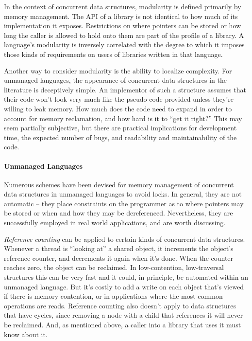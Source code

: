 In the context of concurrent data structures, modularity is defined primarily by memory management.  The API of a library is not identical to how much of its implementation it exposes.  Restrictions on where pointers can be stored or how long the caller is allowed to hold onto them are part of the profile of a library.  A language's modularity is inversely correlated with the degree to which it imposes those kinds of requirements on users of libraries written in that language.

Another way to consider modularity is the ability to localize complexity.  For unmanaged languages, the appearance of concurrent data structures in the literature is deceptively simple.  An implementor of such a structure assumes that their code won't look very much like the pseudo-code provided unless they're willing to leak memory.  How much does the code need to expand in order to account for memory reclamation, and how hard is it to ``get it right?''  This may seem partially subjective, but there are practical implications for development time, the expected number of bugs, and readability and maintainability of the code.

\paragraph{Unmanaged Languages} Numerous schemes have been devised for memory management of concurrent data structures in unmanaged languages to avoid locks.  In general, they are not automatic -- they place constraints on the programmer as to where pointers may be stored or when and how they may be dereferenced.  Nevertheless, they are successfully employed in real world applications, and are worth discussing.

\textit{Reference counting} can be applied to certain kinds of concurrent data structures\cite{DMMS, GPST09}.  Whenever a thread is ``looking at'' a shared object, it increments the object's reference counter, and decrements it again when it's done.  When the counter reaches zero, the object can be reclaimed.  In low-contention, low-traversal structures this can be very fast and it could, in principle, be automated within an unmanaged language.  But it's costly to add a write on each object that's viewed if there is memory contention, or in applications where the most common operations are reads.  Reference counting also doesn't apply to data structures that have cycles, since removing a node with a child that references it will never be reclaimed.  And, as mentioned above, a caller into a library that uses it must know about it.

